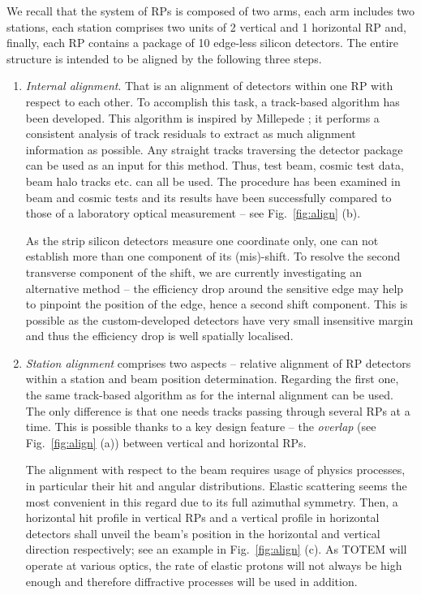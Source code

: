 \documentclass{desyproc}
\begin{document}
We recall that the system of RPs is composed of two arms, each arm includes two stations, each station comprises two units of 2 vertical and 1 horizontal RP and, finally, each RP contains a package of 10 edge-less silicon detectors. The entire structure is intended to be aligned by the following three steps.
\begin{enumerate}
\item {\em Internal alignment}. That is an alignment of detectors within one RP with respect to each other. To accomplish this task, a track-based algorithm has been developed. This algorithm is inspired by Millepede \cite{millepede}; it performs a consistent analysis of track residuals to extract as much alignment information as possible. Any straight tracks traversing the detector package can be used as an input for this method. Thus, test beam, cosmic test data, beam halo tracks etc\hbox{.} can all be used. The procedure has been examined in beam and cosmic tests and its results have been successfully compared to those of a laboratory optical measurement -- see Fig.~\ref{fig:align} (b).

As the strip silicon detectors measure one coordinate only, one can not establish more than one component of its (mis)-shift. To resolve the second transverse component of the shift, we are currently investigating an alternative method -- the efficiency drop around the sensitive edge may help to pinpoint the position of the edge, hence a second shift component. This is possible as the custom-developed detectors have very small insensitive margin and thus the efficiency drop is well spatially localised.

\item {\em Station alignment} comprises two aspects -- relative alignment of RP detectors within a station and beam position determination. Regarding the first one, the same track-based algorithm as for the internal alignment can be used. The only difference is that one needs tracks passing through several RPs at a time. This is possible thanks to a key design feature -- the {\em overlap} (see Fig.~\ref{fig:align} (a)) between vertical and horizontal RPs.

The alignment with respect to the beam requires usage of physics processes, in particular their hit and angular distributions. Elastic scattering seems the most convenient in this regard due to its full azimuthal symmetry. Then, a horizontal hit profile in vertical RPs and a vertical profile in horizontal detectors shall unveil the beam's position in the horizontal and vertical direction respectively; see an example in Fig.~\ref{fig:align} (c). As TOTEM will operate at various optics, the rate of elastic protons will not always be high enough and therefore diffractive processes will be used in addition.


\end{enumerate}
\end{document}
